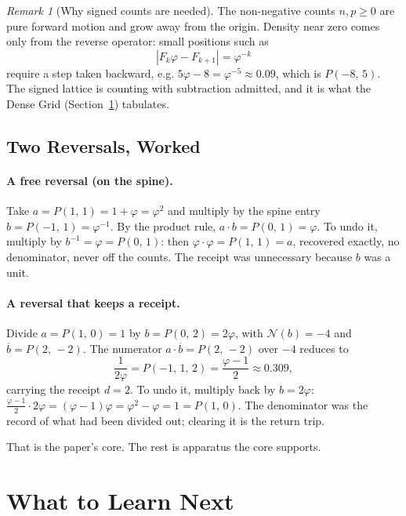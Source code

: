 \documentclass[11pt]{article}
\theoremstyle{definition}
\theoremstyle{remark}
\newtheorem{remark}[theorem]{Remark}
\newcommand{\Pb}[2]{P(#1,\,#2)}
\newcommand{\Pbd}[3]{P(#1,\,#2,\,#3)}
\newcommand{\Norm}{\mathcal{N}}
\begin{document}
\begin{remark}[Why signed counts are needed]
\label{rem:signed}
The non-negative counts $n,p\ge0$ are pure forward motion and grow away from the
origin. Density near zero comes only from the reverse operator: small positions
such as
\[
  |F_k\varphi - F_{k+1}| = \varphi^{-k}
\]
require a step taken backward, e.g. $5\varphi-8=\varphi^{-5}\approx0.09$, which is
$\Pb{-8}{5}$. The signed lattice is counting with subtraction admitted, and it is
what the Dense Grid (Section~\ref{sec:next}) tabulates.
\end{remark}

\subsection{Two Reversals, Worked}

\paragraph{A free reversal (on the spine).}
Take $a=\Pb{1}{1}=1+\varphi=\varphi^2$ and multiply by the spine entry
$b=\Pb{-1}{1}=\varphi^{-1}$. By the product rule,
$a\cdot b=\Pb{0}{1}=\varphi$. To undo it, multiply by $b^{-1}=\varphi=\Pb{0}{1}$:
then $\varphi\cdot\varphi=\Pb{1}{1}=a$, recovered exactly, no denominator, never
off the counts. The receipt was unnecessary because $b$ was a unit.

\paragraph{A reversal that keeps a receipt.}
Divide $a=\Pb{1}{0}=1$ by $b=\Pb{0}{2}=2\varphi$, with $\Norm(b)=-4$ and
$\overline{b}=\Pb{2}{-2}$. The numerator $a\cdot\overline{b}=\Pb{2}{-2}$ over
$-4$ reduces to
\[
  \frac{1}{2\varphi}=\Pbd{-1}{1}{2}=\frac{\varphi-1}{2}\approx0.309,
\]
carrying the receipt $d=2$. To undo it, multiply back by $b=2\varphi$:
$\tfrac{\varphi-1}{2}\cdot2\varphi=(\varphi-1)\varphi=\varphi^2-\varphi=1=\Pb{1}{0}$.
The denominator was the record of what had been divided out; clearing it is the
return trip.

That is the paper's core. The rest is apparatus the core supports.

\section{What to Learn Next}
\label{sec:next}
\end{document}
